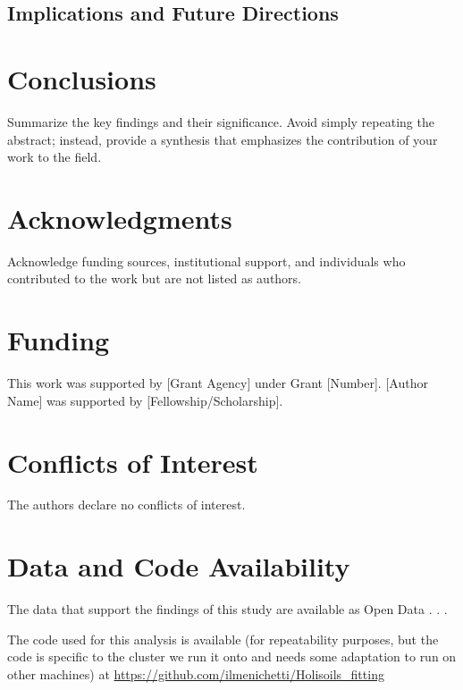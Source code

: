 \documentclass[12pt,a4paper]{article}
\begin{document}
\subsection{Implications and Future Directions}



\section{Conclusions}

Summarize the key findings and their significance. Avoid simply repeating the abstract; instead, provide a synthesis that emphasizes the contribution of your work to the field.


\section*{Acknowledgments}

Acknowledge funding sources, institutional support, and individuals who contributed to the work but are not listed as authors.


\section*{Funding}

This work was supported by [Grant Agency] under Grant [Number]. [Author Name] was supported by [Fellowship/Scholarship].


\section*{Conflicts of Interest}

The authors declare no conflicts of interest.


\section*{Data and Code Availability}

The data that support the findings of this study are available as Open Data . . .

The code used for this analysis is available (for repeatability purposes, but the code is specific to the cluster we run it onto and needs some adaptation to run on other machines) at \url{https://github.com/ilmenichetti/Holisoils_fitting}







\end{document}
